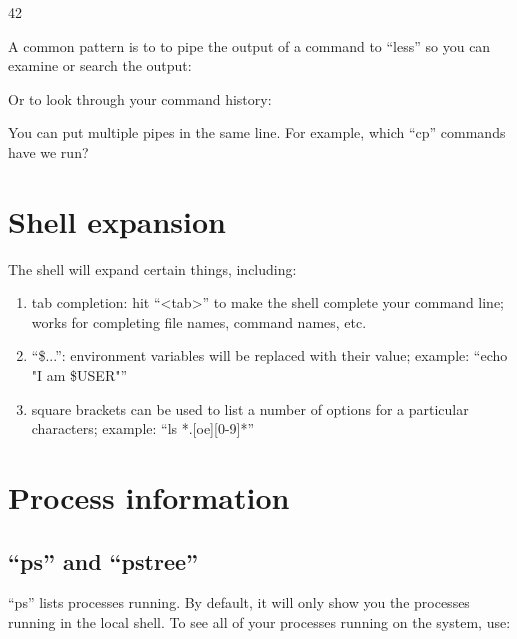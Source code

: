 \begin{prompt}
     42
\end{prompt}

A common pattern is to to pipe the output of a command to ``less'' so you can
examine or search the output:

\begin{prompt}
\end{prompt}

Or to look through your command history:

\begin{prompt}
\end{prompt}

You can put multiple pipes in the same line. For example, which ``cp'' commands have we run?

\begin{prompt}
\end{prompt}

\section{Shell expansion}

The shell will expand certain things, including:

\begin{enumerate}
\tem ``*'' wildcard: for example ``ls t*txt'' will list all files starting with 't' and ending in 'txt'
\item tab completion: hit ``<tab>'' to make the shell complete your command line; works for completing file names, command names, etc.
\item ``\${...}'': environment variables will be replaced with their value;
example: ``echo "I am \$USER"''
\item square brackets can be used to list a number of options for a particular characters; example: ``ls *.[oe][0-9]*''
\end{enumerate}

\section{Process information}

\subsection{``ps'' and ``pstree''}
``ps'' lists processes running. By default, it will only show you the processes
running in the local shell. To see all of your processes running on the system,
use:

